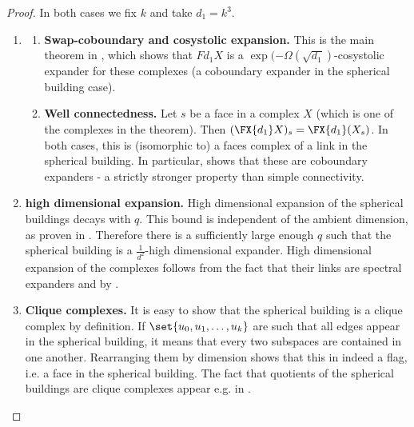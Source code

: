 \begin{proof}
In both cases we fix \(k\) and take \(d_1 = k^3\).
\begin{enumerate}
\item \begin{enumerate}
        \item\textbf{Swap-coboundary and cosystolic expansion.} This is the main theorem in \cite{DiksteinD2023b}, which shows that \(F{d_1}X\) is a \(\exp(-\Omega(\sqrt{d_1})\)-cosystolic expander for these complexes (a coboundary expander in the spherical building case).
        \item\textbf{Well connectedness.} Let \(s\) be a face in a complex \(X\) (which is one of the complexes in the theorem). Then \((\FX{d_1}X)_s = \FX{d_1}(X_s)\). In both cases, this is (isomorphic to) a faces complex of a link in the spherical building. In particular, \cite{DiksteinD2023b} shows that these are coboundary expanders - a strictly stronger property than simple connectivity.
\end{enumerate}
    \item\textbf{high dimensional expansion.} High dimensional expansion of the spherical buildings decays with \(q\). This bound is independent of the ambient dimension, as proven in \cite{AbdolazimiO2022}. Therefore there is a sufficiently large enough \(q\) such that the spherical building is a \(\frac{1}{d^2}\)-high dimensional expander. High dimensional expansion of the \cite{LubotzkySV2005b} complexes follows from the fact that their links are spectral expanders and  by \cite{Oppenheim2018}.
    \item\textbf{Clique complexes.} It is easy to show that the spherical building is a clique complex by definition. If \(\set{u_0,u_1,\dots,u_k}\) are such that all edges appear in the spherical building, it means that every two subspaces are contained in one another. Rearranging them by dimension shows that this in indeed a flag, i.e. a face in the spherical building. The fact that quotients of the spherical buildings are clique complexes appear e.g. in \cite{LubotzkySV2005a}. 

\end{enumerate}
\end{proof}

